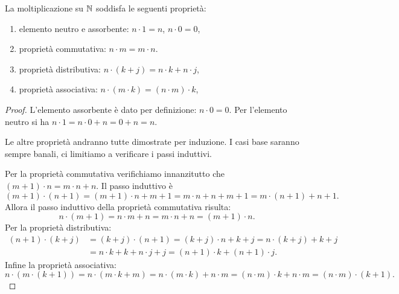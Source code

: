 % 
\begin{theorem}
  \label{th:proprieta_moltiplicazione}%
La moltiplicazione su ${\mathbb N}$ soddisfa le seguenti proprietà:
\begin{enumerate}
  \item elemento neutro e assorbente: $n\cdot 1=n$, $n\cdot 0=0$,
  \item proprietà commutativa: $n\cdot m = m\cdot n$.
  \item proprietà distributiva: $n\cdot(k+j) = n\cdot k + n\cdot j$,
  \item proprietà associativa: $n\cdot(m\cdot k) = (n\cdot m)\cdot k$,
\end{enumerate}
\end{theorem}
\begin{proof}
  L'elemento assorbente è dato per definizione: $n\cdot 0 = 0$.
  Per l'elemento neutro si ha $n\cdot 1 = n\cdot 0 + n = 0+n=n$.

  Le altre proprietà andranno tutte dimostrate 
  per induzione. 
  I casi base saranno sempre banali, ci limitiamo a verificare 
  i passi induttivi. 

  Per la proprietà commutativa verifichiamo innanzitutto che 
  $(m+1)\cdot n = m\cdot n + n$. 
  Il passo induttivo è
  \[
  (m+1)\cdot(n+1) 
  = (m+1)\cdot n + m + 1  
  = m\cdot n + n + m + 1
  = m\cdot (n+1) + n + 1. 
  \]
  Allora il passo induttivo della proprietà commutativa risulta:
  \[
  n\cdot (m+1) 
  = n\cdot m + n 
  = m \cdot n + n 
  = (m+1)\cdot n.  
  \]
  Per la proprietà distributiva:
  \begin{align*}
  (n+1)\cdot(k+j) 
  &= (k+j)\cdot (n+1)  
  = (k+j)\cdot n + k + j
  = n\cdot(k+j) + k + j\\
  &= n\cdot k +k + n\cdot j + j
  = (n+1)\cdot k + (n+1)\cdot j.
  \end{align*}
  Infine la proprietà associativa:
  \[
  n\cdot(m\cdot(k+1))
  = n\cdot (m\cdot k + m) 
  = n\cdot (m\cdot k) + n\cdot m
  = (n\cdot m)\cdot k + n\cdot m
  = (n\cdot m)\cdot (k+1). 
  \]
\end{proof}

% 

